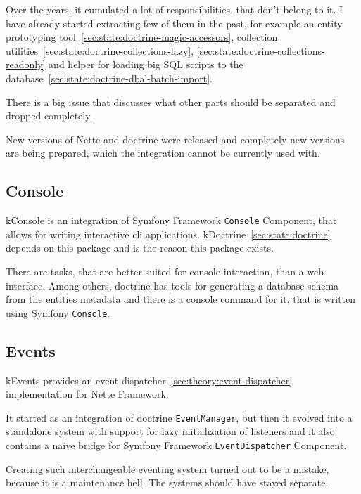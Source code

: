 Over the years, it cumulated a lot of responsibilities, that don't belong to it. I have already started extracting few of them in the past, for example an entity prototyping tool~\ref{sec:state:doctrine-magic-accessors}, collection utilities~\ref{sec:state:doctrine-collections-lazy}, \ref{sec:state:doctrine-collections-readonly} and helper for loading big SQL scripts to the database~\ref{sec:state:doctrine-dbal-batch-import}.

There is a big issue  that discusses what other parts should be separated and dropped completely.

New versions of Nette and \gls{doctrine} were released and completely new versions are being prepared, which the integration cannot be currently used with.

\subsection{Console} \label{sec:state:console}

\gls{kConsole} is an integration of Symfony Framework \lstinline{Console} Component, that allows for writing interactive cli applications. \gls{kDoctrine}~\ref{sec:state:doctrine} depends on this package and is the reason this package exists.

There are tasks, that are better suited for console interaction, than a web interface. Among others, \gls{doctrine} has tools for generating a database schema from the entities metadata and there is a console command for it, that is written using Symfony \lstinline{Console}.

\subsection{Events} \label{sec:state:events}

\gls{kEvents} provides an event dispatcher~\ref{sec:theory:event-dispatcher} implementation for Nette Framework.

It started as an integration of \gls{doctrine} \lstinline{EventManager}, but then it evolved into a standalone system with support for lazy initialization of listeners and it also contains a naive bridge for Symfony Framework \lstinline{EventDispatcher} Component.

Creating such interchangeable eventing system turned out to be a mistake, because it is a maintenance hell. The systems should have stayed separate.

